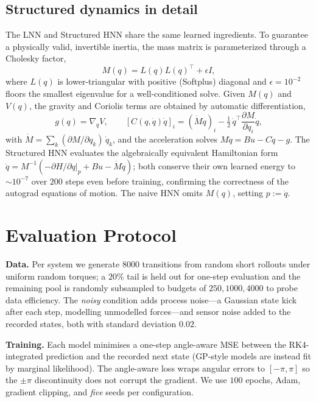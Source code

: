 \documentclass[conference]{IEEEtran}
\begin{document}
\subsection{Structured dynamics in detail}
The LNN and Structured HNN share the same learned ingredients. To guarantee a
physically valid, invertible inertia, the mass matrix is parameterized through a
Cholesky factor,
\begin{equation}
M(q) = L(q)L(q)^\top + \epsilon I,
\end{equation}
where $L(q)$ is lower-triangular with positive (Softplus) diagonal and
$\epsilon=10^{-2}$ floors the smallest eigenvalue for a well-conditioned solve.
Given $M(q)$ and $V(q)$, the gravity and Coriolis terms are obtained by automatic
differentiation,
\begin{equation}
g(q)=\nabla_q V,\qquad
[C(q,\dot q)\dot q]_i = (\dot M\dot q)_i - \tfrac12\,\dot q^\top
   \frac{\partial M}{\partial q_i}\dot q,
\end{equation}
with $\dot M = \sum_k (\partial M/\partial q_k)\,\dot q_k$, and the acceleration
solves $M\ddot q = Bu - C\dot q - g$. The Structured HNN evaluates the
algebraically equivalent Hamiltonian form
$\ddot q = M^{-1}\!\left(-\partial H/\partial q|_p + Bu - \dot M\dot q\right)$;
both conserve their own learned energy to $\sim\!10^{-7}$ over $200$ steps even
before training, confirming the correctness of the autograd equations of motion.
The naive HNN omits $M(q)$, setting $p:=\dot q$.

\section{Evaluation Protocol}
\textbf{Data.} Per system we generate $8000$ transitions from random short
rollouts under uniform random torques; a $20\%$ tail is held out for one-step
evaluation and the remaining pool is randomly subsampled to budgets of
$250,1000,4000$ to probe data efficiency. The \emph{noisy} condition adds process
noise---a Gaussian state kick after each step, modelling unmodelled forces---and
sensor noise added to the recorded states, both with standard deviation $0.02$.

\textbf{Training.} Each model minimises a one-step angle-aware MSE between the
RK4-integrated prediction and the recorded next state (GP-style models are instead
fit by marginal likelihood). The angle-aware loss wraps angular errors to
$[-\pi,\pi]$ so the $\pm\pi$ discontinuity does not corrupt the gradient. We use
$100$ epochs, Adam, gradient clipping, and \emph{five} seeds per configuration.
\end{document}
